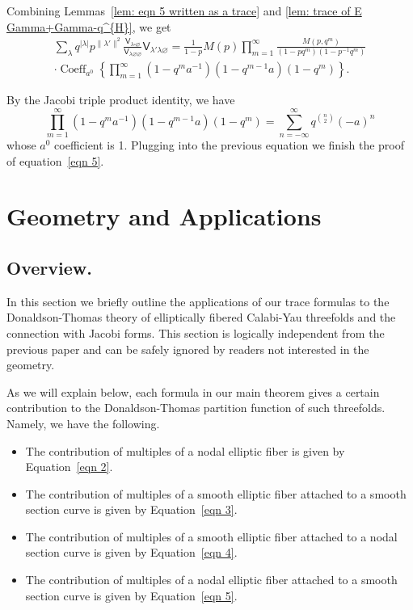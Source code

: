 \documentclass[12pt]{amsart}
\newcommand{\Vsf}{\mathsf{V}}
\newcommand{\bx}{\square}
\renewcommand{\emptyset}{\varnothing}
\theoremstyle{definition}
\begin{document}
Combining Lemmas~\ref{lem: eqn 5 written as a trace} and \ref{lem:
trace of E Gamma+Gamma-q^{H}}, we get
\begin{multline*}
\sum_{\lambda} q^{|\lambda |} p^{\| \lambda' \|  ^{2}} \frac{\Vsf_{\lambda
\bx \emptyset}}{\Vsf_{\lambda \emptyset \emptyset}} \Vsf_{\lambda
'\lambda \emptyset} =\frac{1}{1-p} M(p)\prod_{m=1}^{\infty}
\frac{M(p,q^{m})}{(1-pq^{m})(1-p^{-1}q^{m})}\\
 \cdot \operatorname{Coeff}_{a^{0}}\left\{\prod_{m=1}^{\infty}
(1-q^{m}a^{-1})(1-q^{m-1}a)(1-q^{m}) \right\}.
\end{multline*}

By the Jacobi triple product identity, we have
\[
\prod_{m=1}^{\infty} (1-q^{m}a^{-1})(1-q^{m-1}a)(1-q^{m}) =
\sum_{n=-\infty}^{\infty} q^{\binom{n}{2}} (-a)^{n}
\]
whose $a^{0}$ coefficient is 1. Plugging into the previous equation we
finish the proof of equation~\eqref{eqn 5}.

\section{Geometry and Applications}\label{sec: geometry and applications}


\subsection{Overview.} In this section we briefly outline the
applications of our trace formulas to the Donaldson-Thomas theory of
elliptically fibered Calabi-Yau threefolds
\cite{Bryan-K3xE,Bryan-Kool,BOPY} and the connection with Jacobi
forms. This section is logically independent from the previous paper
and can be safely ignored by readers not interested in the geometry.

As we will explain below, each formula in our main theorem gives a
certain contribution to the Donaldson-Thomas partition function of
such threefolds. Namely, we have the following.
\begin{itemize}
\item The contribution of multiples of a nodal elliptic fiber is given
by Equation~\eqref{eqn 2}.
\item The contribution of multiples of a smooth elliptic fiber
attached to a smooth section curve is given by Equation~\eqref{eqn 3}.
\item The contribution of multiples of a smooth elliptic fiber
attached to a nodal section curve is given by Equation~\eqref{eqn 4}.
\item The contribution of multiples of a nodal elliptic fiber
attached to a smooth section curve is given by Equation~\eqref{eqn 5}.
\end{itemize}
\end{document}
